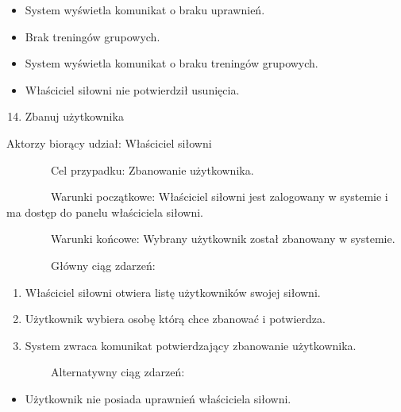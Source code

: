 \documentclass[
]{article}
\providecommand{\tightlist}{%
  \setlength{\itemsep}{0pt}\setlength{\parskip}{0pt}}
\begin{document}
\begin{itemize}
\tightlist
\item
  {System wyświetla komunikat o braku uprawnień.}
\end{itemize}

\begin{itemize}
\tightlist
\item
  {Brak treningów grupowych.}
\end{itemize}

\begin{itemize}
\tightlist
\item
  {System wyświetla komunikat o braku treningów grupowych.}
\end{itemize}

\begin{itemize}
\tightlist
\item
  {Właściciel siłowni nie potwierdził usunięcia.\\
  }
\end{itemize}

\begin{enumerate}
\setcounter{enumi}{13}
\tightlist
\item
  {Zbanuj użytkownika}
\end{enumerate}

{Aktorzy biorący udział: Właściciel siłowni}

{~~~~~~~~Cel przypadku: Zbanowanie użytkownika.}

{~~~~~~~~Warunki początkowe: Właściciel siłowni jest zalogowany w
systemie i ma dostęp do panelu właściciela siłowni.}

{~~~~~~~~Warunki końcowe: Wybrany użytkownik został zbanowany w
systemie.}

{~~~~~~~~Główny ciąg zdarzeń:}

\begin{enumerate}
\tightlist
\item
  {Właściciel siłowni otwiera listę użytkowników swojej siłowni.}
\item
  {Użytkownik wybiera osobę którą chce zbanować i potwierdza.}
\item
  {System zwraca komunikat potwierdzający zbanowanie użytkownika.}
\end{enumerate}

{~~~~~~~~Alternatywny ciąg zdarzeń:}

\begin{itemize}
\tightlist
\item
  {Użytkownik nie posiada uprawnień właściciela siłowni.}
\end{itemize}
\end{document}
